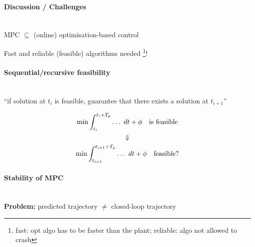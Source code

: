 \paragraph{Discussion / Challenges} ~\\
MPC $\subseteq$ (online) optimisation-based control
\begin{figure}[H]
    \centering
\end{figure}

Fast and reliable (feasible) algorithms needed%
\footnote{fast: opt algo has to be faster than the plant; reliable: algo not allowed to crash}!\\

\paragraph{Sequential/recursive feasibility} ~\\
``if solution at $t_i$ is feasible, guarantee that there exists
a solution at $t_{i+1}$''

\begin{gather*}
    \min \int_{t_i}^{t_i+T_p} \dots ~dt + \phi \quad \textnormal{is feasible}\\
    \Downarrow\\
    \min \int_{t_{i+1}}^{t_{i+1}+T_p} \dots ~dt + \phi \quad \textnormal{feasible?}
\end{gather*}

\paragraph{Stability of MPC} ~\\
\textbf{Problem:} predicted trajectory $\neq$ closed-loop trajectory


